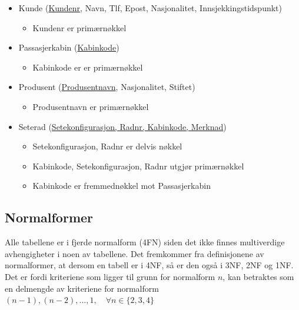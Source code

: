 \documentclass[a4paper,12pt]{article}
\begin{document}
\begin{itemize}
\item Kunde (\underline{Kundenr}, Navn, Tlf, Epost, Nasjonalitet, Innsjekkingstidspunkt)
\begin{itemize}
\item Kundenr er primærnøkkel
\end{itemize}

\item Passasjerkabin (\underline{Kabinkode})
\begin{itemize}
\item Kabinkode er er primærnøkkel
\end{itemize}

\item Produsent (\underline{Produsentnavn}, Nasjonalitet, Stiftet)
\begin{itemize}
\item Produsentnavn er primærnøkkel
\end{itemize}

\item Seterad (\underline{Setekonfigurasjon, Radnr, Kabinkode, Merknad})
\begin{itemize}
\item Setekonfigurasjon, Radnr er delvis nøkkel
\item Kabinkode, Setekonfigurasjon, Radnr utgjør primærnøkkel
\item Kabinkode er fremmednøkkel mot Passasjerkabin 
\end{itemize}

\end{itemize}

\subsection{Normalformer}
Alle tabellene er i fjerde normalform (4FN) siden det ikke finnes
multiverdige avhengigheter i noen av tabellene. Det fremkommer fra definisjonene
av normalformer, at dersom en tabell er i 4NF, så er den også i 3NF, 2NF og 1NF.
Det er fordi kriteriene som ligger til grunn for normalform $n$, kan betraktes
som en delmengde av kriteriene for normalform $(n-1), (n-2), \ldots, 1, \quad \forall
n \in \{2,3,4\}$
\end{document}
